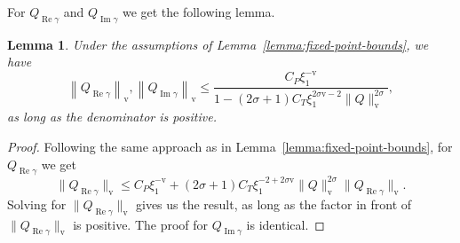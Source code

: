 \documentclass[11pt]{article}
\DeclareMathOperator{\real}{Re}
\DeclareMathOperator{\imag}{Im}
\newcommand{\normv}{\mathrm{v}}
\newtheorem{lemma}[definition]{Lemma}
\begin{document}
For \(Q_{\real\gamma}\) and \(Q_{\imag\gamma}\) we get the following
lemma.
\begin{lemma}\label{lemma:norm-Q-dgamma}
  Under the assumptions of Lemma~\ref{lemma:fixed-point-bounds}, we
  have
  \begin{equation*}
    \left\|Q_{\real\gamma}\right\|_{\normv}, \left\|Q_{\imag\gamma}\right\|_{\normv}
    \leq \frac{C_{P}\xi_{1}^{-\normv}}{1 - (2\sigma + 1)C_{T}\xi_{1}^{2\sigma\normv - 2}\|Q\|_{\normv}^{2\sigma}},
  \end{equation*}
  as long as the denominator is positive.
\end{lemma}

\begin{proof}
  Following the same approach as in
  Lemma~\ref{lemma:fixed-point-bounds}, for \(Q_{\real\gamma}\) we get
  \begin{equation*}
    \|Q_{\real\gamma}\|_{\normv}
    \leq C_{P}\xi_{1}^{-\normv} + (2\sigma + 1)C_{T}\xi_{1}^{-2 + 2\sigma\normv}\|Q\|_{\normv}^{2\sigma}\|Q_{\real\gamma}\|_{\normv}.
  \end{equation*}
  Solving for \(\|Q_{\real\gamma}\|_{\normv}\) gives us the result, as
  long as the factor in front of \(\|Q_{\real\gamma}\|_{\normv}\) is
  positive. The proof for \(Q_{\imag\gamma}\) is identical.
\end{proof}
\end{document}
